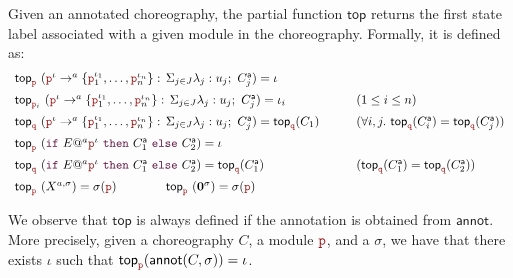 \newcommand{\toprole}{\mathsf{top}}

Given an annotated choreography, the partial function $\toprole$
returns the first state label associated with a given module in the
choreography.  Formally, it is defined as:
%
\[
  \begin{array}{lll}

    \toprole_{\nr}\ ( \interactl{\nr^{\iota}}a{\nr_1^{\iota_1},\ldots,\nr_n^{\iota_n}})
    = \iota
    \\[2mm]

    \toprole_{\nr_i}\ ( \interactl{\nr^{\iota}}a{\nr_1^{\iota_1},\ldots,\nr_n^{\iota_n}})
    = \iota_i
    &    \qquad (1 \le i \le n)
    \\[2mm]

    \toprole_{\nrr}\ ( \interactl{\nr^{\iota}}a{\nr_1^{\iota_1},\ldots,\nr_n^{\iota_n}})
    = \toprole_{\nrr}(C_1)
    &  \qquad (\forall i,j.\
      \toprole_{\nrr}(\anno C_i)=\toprole_{\nrr}(\anno C_j))
    \\[2mm]

    \toprole_{\nr}\ (\ifTEl{E}a{\nr^{\iota}}{\anno C_1}{\anno C_2})
    = \iota
    \\[2mm]

    \toprole_{\nrr}\ ( \ifTEl{E}a{\nr^{\iota}}{\anno C_1}{\anno C_2})
    = \toprole_{\nrr}(\anno C_1)
    & \qquad (\toprole_{\nrr}(\anno C_1)=\toprole_{\nrr}(\anno C_2))
    \\[2mm]

    \toprole_{\nr}\ ( X^{a,\sigma})
    = \sigma(\nr)
    \qquad\qquad
    \toprole_{\nr}\ (\CEnd^{\sigma})
    = \sigma(\nr)
\end{array}
\]

We observe that $\toprole$ is always defined if the annotation is
obtained from $\mathsf{annot}$. More precisely, given a choreography
$C$, a module $\nr$, and a $\sigma$, we have that there exists $\iota$
such that $\toprole_{\nr}(\mathsf{annot}(C,\sigma))=\iota$.


